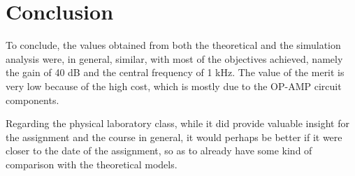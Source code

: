 \section{Conclusion}
\label{sec:conclusion}

To conclude, the values obtained from both the theoretical and the simulation analysis were, in general, similar, with most of the objectives achieved, namely the gain of 40 dB and the central frequency of 1 kHz. The value of the merit is very low because of the high cost, which is mostly due to the OP-AMP circuit components.

Regarding the physical laboratory class, while it did provide valuable insight for the assignment and the course in general, it would perhaps be better if it were closer to the date of the assignment, so as to already have some kind of comparison with the theoretical models.

